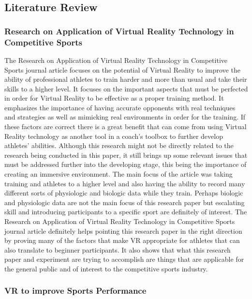 \documentclass{sigchi}
\begin{document}
\subsection{Literature Review}
\subsubsection{Research on Application of Virtual Reality Technology in Competitive Sports}

The Research on Application of Virtual Reality Technology in Competitive Sports journal article\cite{sanz_franck_lecuyer_anatole_ferran_2015} focuses on the potential of Virtual Reality to improve the ability of professional athletes to train harder and more than usual and take their skills to a higher level. It focuses on the important aspects that must be perfected in order for Virtual Reality to be effective as a proper training method. It emphasizes the importance of having accurate opponents with real techniques and strategies as well as mimicking real environments in order for the training. If these factors are correct there is a great benefit that can come from using Virtual Reality technology as another tool in a coach’s toolbox to further develop athletes’ abilities. Although this research might not be directly related to the research being conducted in this paper, it still brings up some relevant issues that must be addressed further into the developing stage, this being the importance of creating an immersive environment. The main focus of the article was taking training and athletes to a higher level and also having the ability to record many different sorts of physiologic and biologic data while they train. Perhaps biologic and physiologic data are not the main focus of this research paper but escalating skill and introducing participants to a specific sport are definitely of interest. The Research on Application of Virtual Reality Technology in Competitive Sports journal article definitely helps pointing this research paper in the right direction by proving many of the factors that make VR appropriate for athletes that can also translate to beginner participants. It also shows that what this research paper and experiment are trying to accomplish are things that are applicable for the general public and of interest to the competitive sports industry.

\subsubsection{VR to improve Sports Performance}
\end{document}
